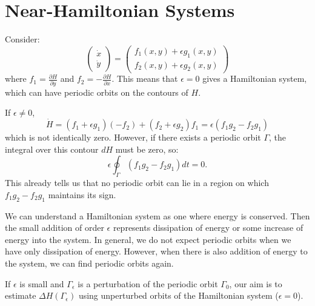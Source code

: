\documentclass[../Main.tex]{subfiles}
\begin{document}
\section{Near-Hamiltonian Systems}
\label{secNearHamiltonian}
Consider:
\begin{equation*}
    \begin{pmatrix}\dot{x} \\ \dot{y}\end{pmatrix} = \begin{pmatrix}f_1(x, y) + \epsilon g_1(x, y) \\ f_2(x, y) + \epsilon g_2(x, y)\end{pmatrix}
\end{equation*}
where $f_1 = \frac{\partial H}{\partial y}$ and $f_2 = -\frac{\partial H}{\partial x}$. This means that $\epsilon = 0$ gives a Hamiltonian system, which can have periodic orbits on the contours of $H$.

If $\epsilon \neq 0$,
\begin{equation*}
    \dot{H} = (f_1 + \epsilon g_1)(-f_2) + (f_2 + \epsilon g_2) f_1 = \epsilon(f_1 g_2 - f_2 g_1)
\end{equation*}
which is not identically zero. However, if there exists a periodic orbit $\Gamma$, the integral over this contour $dH$ must be zero, so:
\begin{equation*}
    \epsilon \oint_\Gamma (f_1 g_2 - f_2 g_1) dt = 0.
\end{equation*}
This already tells us that no periodic orbit can lie in a region on which $f_1 g_2 - f_2 g_1$ maintains its sign.

\begin{remark}
    We can understand a Hamiltonian system as one where energy is conserved. Then the small addition of order $\epsilon$ represents dissipation of energy or some increase of energy into the system. In general, we do not expect periodic orbits when we have only dissipation of energy. However, when there is also addition of energy to the system, we can find periodic orbits again.
\end{remark}

If $\epsilon$ is small and $\Gamma_\epsilon$ is a perturbation of the periodic orbit $\Gamma_0$, our aim is to estimate $\Delta H(\Gamma_\epsilon)$ using unperturbed orbits of the Hamiltonian system ($\epsilon = 0$).
\end{document}
